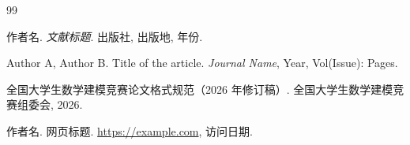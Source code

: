 \documentclass[withoutpreface,bwprint]{cumcmthesis}
\newcommand{\scite}[1]{\textsuperscript{[#1]}}
\begin{document}
\begin{thebibliography}{99}

    作者名. \textit{文献标题}\allowbreak[M]. 出版社, 出版地, 年份.

    Author A, Author B. Title of the article\allowbreak[J]. \textit{Journal Name}, Year, Vol(Issue): Pages.

    全国大学生数学建模竞赛论文格式规范（2026 年修订稿）\allowbreak[S]. 全国大学生数学建模竞赛组委会, 2026.

    作者名. 网页标题\allowbreak[EB/OL]. \url{https://example.com}, 访问日期.

\end{thebibliography}

\newpage
\end{document}
